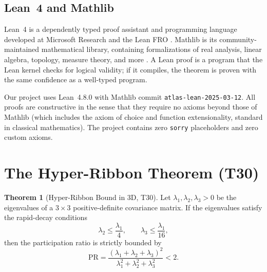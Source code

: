 \documentclass[11pt,a4paper]{article}
\theoremstyle{definition}
\newtheorem{theorem}{Theorem}[section]
\theoremstyle{plain}
\begin{document}
\subsection{Lean~4 and Mathlib}
\label{subsec:lean}

Lean~4 is a dependently typed proof assistant and programming language developed at Microsoft Research and the Lean FRO \cite{moura2021lean}. Mathlib is its community-maintained mathematical library, containing formalizations of real analysis, linear algebra, topology, measure theory, and more \cite{mathlib2020}. A Lean proof is a program that the Lean kernel checks for logical validity; if it compiles, the theorem is proven with the same confidence as a well-typed program.

Our project uses Lean~4.8.0 with Mathlib commit \texttt{atlas-lean-2025-03-12}. All proofs are constructive in the sense that they require no axioms beyond those of Mathlib (which includes the axiom of choice and function extensionality, standard in classical mathematics). The project contains zero \texttt{sorry} placeholders and zero custom axioms.

\section{The Hyper-Ribbon Theorem (T30)}
\label{sec:t30}

\begin{theorem}[Hyper-Ribbon Bound in 3D, T30]
\label{thm:hyperribbon}
Let $\lambda_1, \lambda_2, \lambda_3 > 0$ be the eigenvalues of a $3 \times 3$ positive-definite covariance matrix. If the eigenvalues satisfy the rapid-decay conditions
\begin{equation}
\lambda_2 \leq \frac{\lambda_1}{4}, \qquad \lambda_3 \leq \frac{\lambda_1}{16},
\label{eq:decay}
\end{equation}
then the participation ratio is strictly bounded by
\begin{equation}
\mathrm{PR} = \frac{(\lambda_1 + \lambda_2 + \lambda_3)^2}{\lambda_1^2 + \lambda_2^2 + \lambda_3^2} < 2.
\label{eq:pr-bound}
\end{equation}
\end{theorem}
\end{document}
